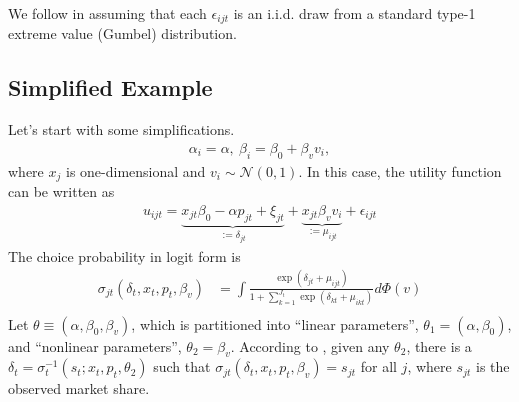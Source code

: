 \documentclass[11pt]{elegantbook}
\begin{document}
We follow \cite{berry1995automobile} in assuming that each $\epsilon_{ijt}$ is an i.i.d. draw from a standard type-1 extreme value (Gumbel) distribution.



\subsection{Simplified Example}
Let's start with some simplifications.
\begin{equation}
    \begin{aligned}
        \alpha_i=\alpha,\ \beta_i=\beta_0+\beta_v v_i,
    \end{aligned}
    \nonumber
\end{equation}
where $x_j$ is one-dimensional and $v_i\sim \mathcal{N}(0,1)$. In this case, the utility function can be written as
\begin{equation}
    \begin{aligned}
        u_{ijt}=\underbrace{x_{jt}\beta_0-\alpha p_{jt}+\xi_{jt}}_{:=\delta_{jt}}+\underbrace{x_{jt}\beta_vv_i}_{:=\mu_{ijt}}+\epsilon_{ijt}
    \end{aligned}
    \nonumber
\end{equation}
The choice probability in logit form is
\begin{equation}
    \begin{aligned}
        \sigma_{jt}\left(\delta_t,x_t,p_t,\beta_v\right)&=\int \frac{\exp(\delta_{jt}+\mu_{ijt})}{1+\sum_{k=1}^{J_t}\exp(\delta_{kt}+\mu_{ikt})}d \Phi(v)\\
    \end{aligned}
    \nonumber
\end{equation}
Let $\theta\equiv(\alpha,\beta_0,\beta_v)$, which is partitioned into ``linear parameters'', $\theta_1=(\alpha,\beta_0)$, and ``nonlinear parameters'', $\theta_2=\beta_v$. According to \cite{berry1994estimating}, given any $\theta_2$, there is a $\delta_t=\sigma_{t}^{-1}\left(s_t; x_t,p_t,\theta_2\right)$ such that $\sigma_{jt}\left(\delta_t,x_t,p_t,\beta_v\right)=s_{jt}$ for all $j$, where $s_{jt}$ is the observed market share.
\end{document}
